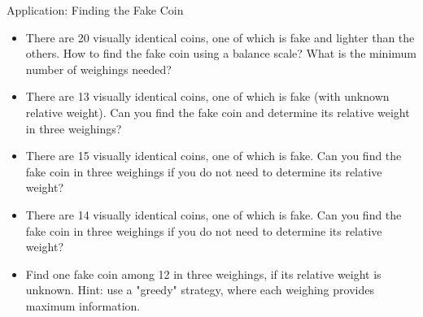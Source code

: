 \documentclass[aspectratio=169]{beamer}
\newcommand{\pitem}{\pause\item}
\begin{document}
\begin{frame}{Application: Finding the Fake Coin}
    \begin{itemize}
        \item There are 20 visually identical coins, one of which is fake and lighter than the others.
        How to find the fake coin using a balance scale? What is the minimum number of weighings needed?

        \pitem There are 13 visually identical coins, one of which is fake (with unknown relative weight).
        Can you find the fake coin and determine its relative weight in three weighings?

        \pitem There are 15 visually identical coins, one of which is fake. Can you find the fake coin in three weighings
        if you do not need to determine its relative weight?

        \pitem There are 14 visually identical coins, one of which is fake. Can you find the fake coin in three weighings
        if you do not need to determine its relative weight?

        \pitem Find one fake coin among 12 in three weighings, if its relative weight is unknown. Hint: use a "greedy" strategy, where each weighing provides maximum information.
    \end{itemize}
\end{frame}
\end{document}
